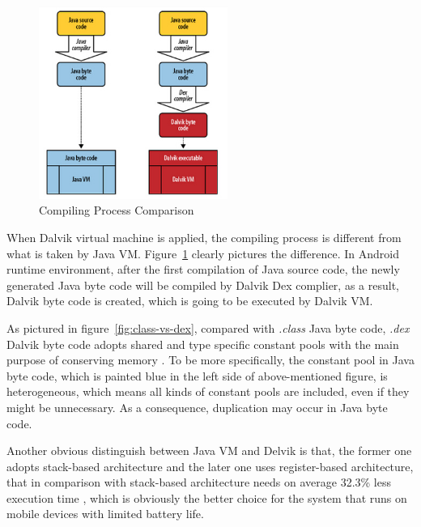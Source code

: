 \begin{figure}[!htb]
	\centering
	\includegraphics[width=0.55\textwidth]{vm-compare.jpg}
		\caption{Compiling Process Comparison \cite{learn_android}}
	\label{fig:vm-compare}
\end{figure}
When Dalvik virtual machine is applied, the compiling process is different from what is taken by Java VM. Figure~\ref{fig:vm-compare} clearly pictures the difference. In Android runtime environment, after the first compilation of Java source code, the newly generated Java byte code will be compiled by Dalvik Dex complier, as a result, Dalvik byte code is created, which is going to be executed by Dalvik VM.

As pictured in figure~\ref{fig:class-vs-dex}, compared with \emph{.class} Java byte code, \emph{.dex} Dalvik byte code adopts shared and type specific constant pools with the main purpose of conserving memory \cite{android_vm}. To be more specifically,  the constant pool in Java byte code, which is painted blue in the left side of above-mentioned figure, is heterogeneous, which means all kinds of constant pools are included, even if they might be unnecessary. As a consequence, duplication may occur in Java byte code.    

Another obvious distinguish between Java VM and Delvik is that, the former one adopts stack-based architecture and  the later one uses register-based architecture, that in comparison with stack-based architecture needs on average 32.3\% less execution time \cite{android_vm}, which is obviously the better choice for the system that runs on mobile devices with limited battery life.

